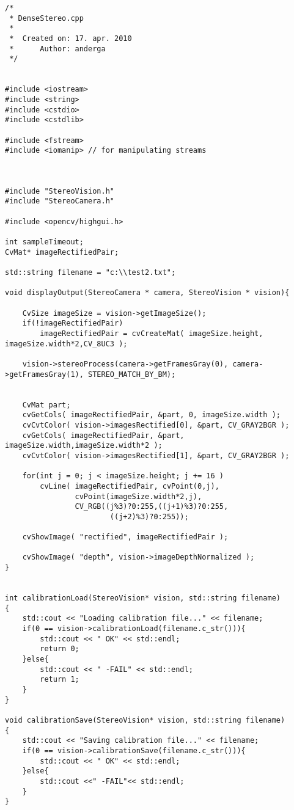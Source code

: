 \begin{lstlisting}
/*
 * DenseStereo.cpp
 *
 *  Created on: 17. apr. 2010
 *      Author: anderga
 */


#include <iostream>
#include <string>
#include <cstdio>
#include <cstdlib>

#include <fstream>
#include <iomanip> // for manipulating streams



#include "StereoVision.h"
#include "StereoCamera.h"

#include <opencv/highgui.h>

int sampleTimeout;
CvMat* imageRectifiedPair;

std::string filename = "c:\\test2.txt";

void displayOutput(StereoCamera * camera, StereoVision * vision){

    CvSize imageSize = vision->getImageSize();
    if(!imageRectifiedPair)
    	imageRectifiedPair = cvCreateMat( imageSize.height, imageSize.width*2,CV_8UC3 );

    vision->stereoProcess(camera->getFramesGray(0), camera->getFramesGray(1), STEREO_MATCH_BY_BM);


    CvMat part;
    cvGetCols( imageRectifiedPair, &part, 0, imageSize.width );
    cvCvtColor( vision->imagesRectified[0], &part, CV_GRAY2BGR );
    cvGetCols( imageRectifiedPair, &part, imageSize.width,imageSize.width*2 );
    cvCvtColor( vision->imagesRectified[1], &part, CV_GRAY2BGR );

    for(int j = 0; j < imageSize.height; j += 16 )
    	cvLine( imageRectifiedPair, cvPoint(0,j),
    			cvPoint(imageSize.width*2,j),
    			CV_RGB((j%3)?0:255,((j+1)%3)?0:255,
    					((j+2)%3)?0:255));

    cvShowImage( "rectified", imageRectifiedPair );

    cvShowImage( "depth", vision->imageDepthNormalized );
}


int calibrationLoad(StereoVision* vision, std::string filename)
{
    std::cout << "Loading calibration file..." << filename;
    if(0 == vision->calibrationLoad(filename.c_str())){
        std::cout << " OK" << std::endl;
        return 0;
    }else{
        std::cout << " -FAIL" << std::endl;
        return 1;
    }
}

void calibrationSave(StereoVision* vision, std::string filename)
{
    std::cout << "Saving calibration file..." << filename;
    if(0 == vision->calibrationSave(filename.c_str())){
        std::cout << " OK" << std::endl;
    }else{
        std::cout <<" -FAIL"<< std::endl;
    }
}


\end{lstlisting}
